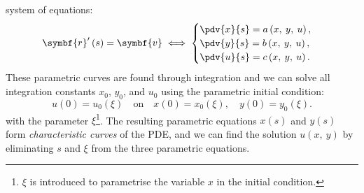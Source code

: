 \documentclass{article}
\theoremstyle{definition}
\begin{document}
system of equations:
\begin{equation*}
    \symbf{r}'\left( s \right) = \symbf{v} \iff
    \begin{cases}
        \displaystyle\pdv{x}{s} = a\left( x,\: y,\: u \right), \\
        \displaystyle\pdv{y}{s} = b\left( x,\: y,\: u \right), \\
        \displaystyle\pdv{u}{s} = c\left( x,\: y,\: u \right).
    \end{cases}
\end{equation*}
These parametric curves are found through integration and we can solve
all integration constants \(x_0\), \(y_0\), and \(u_0\) using the
parametric initial condition:
\begin{equation*}
    u\left( 0 \right) = u_0\left( \xi \right) \quad \text{on} \quad x\left( 0 \right) = x_0\left( \xi \right), \quad y\left( 0 \right) = y_0\left(\xi \right).
\end{equation*}
with the parameter \(\xi\)\footnote{\(\xi\) is introduced to parametrise
the variable \(x\) in the initial condition.}. The resulting parametric
equations \(x\left( s \right)\) and \(y\left( s \right)\) form
\textit{characteristic curves} of the PDE, and we can find the solution
\(u\left( x,\: y \right)\) by eliminating \(s\) and \(\xi\) from the
three parametric equations.
\end{document}
